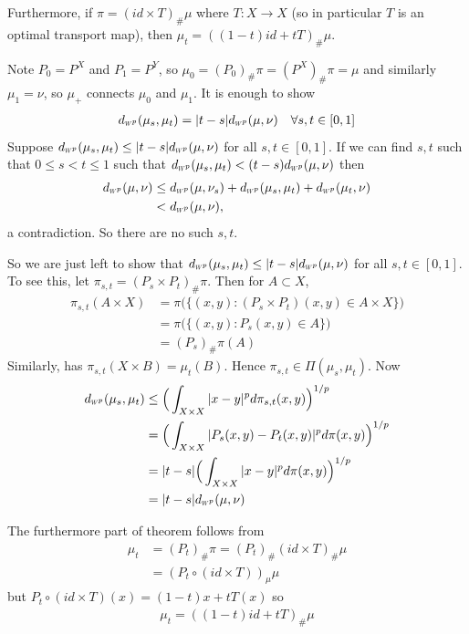 \documentclass[12pt,a4paper]{article}
\newenvironment{proof}
{\begin{changemargin}{1cm}{0.5cm} 
	}%
	{\end{changemargin}
}
\newenvironment{p}
{\begin{proof} 
	}%
	{\end{proof}
}
\begin{document}
\quad Furthermore, if $\pi = (id \times T)_{\#} \mu$ where $T:X\rightarrow X$ (so in particular $T$ is an optimal transport map), then $\mu_t = ((1-t)id + tT)_{\#} \mu$.
\begin{p}
\pf Note $P_0 =P^X$ and $P_1 = P^Y$, so $\mu_0 = (P_0)_{\#} \pi = (P^X)_{\#} \pi = \mu$ and similarly $\mu_1 = \nu$, so $\mu_+$ connects $\mu_0$ and $\mu_1$. It is enough to show
\begin{align*}
\wa{p} (\mu_s, \mu_t) = |t-s| \wa{p}(\mu, \nu) \quad \forall s, t\in [0,1]
\end{align*}
Suppose $\wa{p} (\mu_s, \mu_t) \leq |t-s| \wa{p} (\mu, \nu)$ for all $s, t\in [0,1]$. If we can find $s,t$ such that $0\leq s <t \leq 1$ such that $\wa{p} (\mu_s, \mu_t) < (t-s) \wa{p}(\mu, \nu)$ then
\begin{align*}
\wa{p}(\mu, \nu) &\leq \wa{p} (\mu, \nu_s) + \wa{p}(\mu_s, \mu_t) + \wa{p}(\mu_t, \nu) \\
&< \wa{p}(\mu, \nu), 
\end{align*}
a contradiction. So there are no such $s,t$.

\quad So we are just left to show that $\wa{p} (\mu_s, \mu_t) \leq |t-s| \wa{p} (\mu, \nu)$ for all $s, t\in [0,1]$. To see this, let $\pi_{s,t} = (P_s \times P_t)_{\#} \pi$. Then for $A\subset X$,
\begin{align*}
\pi_{s,t}(A\times X) & = \pi \Big( \Big\{ (x,y) : (P_s \times P_t)(x,y) \in A\times X \Big\} \Big) \\
& = \pi \Big( \Big\{ (x,y) : P_s(x,y) \in A \Big\} \Big) \\
& = (P_s)_{\#}\pi(A)
\end{align*} 
Similarly, has $\pi_{s,t}(X\times B) = \mu_t(B)$. Hence $\pi_{s,t}  \in \Pi(\mu_s, \mu_t)$. Now
\begin{align*}
\wa{p} (\mu_s, \mu_t) & \leq \Big( \int_{X\times X} |x-y|^p d\pi_{s,t}(x,y) \Big)^{1/p} \\
&= \Big( \int_{X\times X} |P_s(x,y) - P_t(x,y)|^p d\pi(x,y) \Big)^{1/p} \\
&= |t-s| \Big( \int_{X\times X} |x-y|^p d\pi(x,y) \Big)^{1/p} \\
&= |t-s| \wa{p} (\mu, \nu)
\end{align*}

\quad The furthermore part of theorem follows from
\begin{align*}
\mu_t &= (P_t)_{\#} \pi = (P_t )_{\#} (id \times T)_{\#} \mu \\
&= (P_t \circ(id \times T))_{\mu} \mu
\end{align*}
but $P_t \circ(id \times T)(x) = (1-t)x + tT(x)$ so
\begin{align*}
\mu_t = ((1-t)id + tT)_{\#} \mu
\end{align*}
\eop
\end{p}
\s
\end{document}
